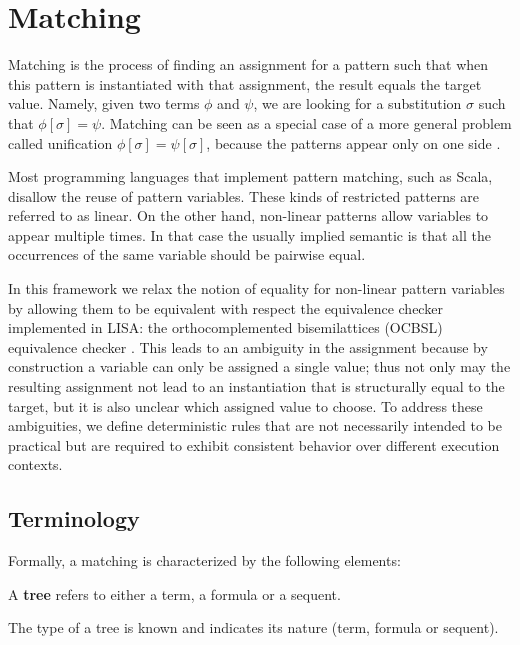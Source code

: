 \section{Matching}
\label{sec:matching}

Matching is the process of finding an assignment for a pattern such that when this pattern is instantiated with that assignment, the result equals the target value. Namely, given two terms $\phi$ and $\psi$, we are looking for a substitution $\sigma$ such that $\phi[\sigma] = \psi$. Matching can be seen as a special case of a more general problem called unification $\phi[\sigma] = \psi[\sigma]$, because the patterns appear only on one side \cite{Knight1989}.

Most programming languages that implement pattern matching, such as Scala, disallow the reuse of pattern variables. These kinds of restricted patterns are referred to as linear. On the other hand, non-linear patterns allow variables to appear multiple times. In that case the usually implied semantic is that all the occurrences of the same variable should be pairwise equal.

In this framework we relax the notion of equality for non-linear pattern variables by allowing them to be equivalent with respect the equivalence checker implemented in LISA: the orthocomplemented bisemilattices (OCBSL) equivalence checker \cite{Guilloud2022}. This leads to an ambiguity in the assignment because by construction a variable can only be assigned a single value; thus not only may the resulting assignment not lead to an instantiation that is structurally equal to the target, but it is also unclear which assigned value to choose. To address these ambiguities, we define deterministic rules that are not necessarily intended to be practical but are required to exhibit consistent behavior over different execution contexts.

\subsection{Terminology}

Formally, a matching is characterized by the following elements:

\begin{definition}[Tree]
A \textbf{tree} refers to either a term, a formula or a sequent.
\end{definition}

The type of a tree is known and indicates its nature (term, formula or sequent).

